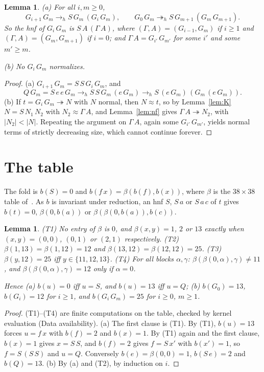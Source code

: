 \documentclass[11pt]{amsart}
\newtheorem{lemma}[theorem]{Lemma}
\theoremstyle{definition}
\newcommand{\red}{\twoheadrightarrow}
\newcommand{\hred}{\twoheadrightarrow_h}
\newcommand{\hstep}{\to_h}
\newcommand{\sz}[1]{\lvert#1\rvert}
\begin{document}
\begin{lemma}\label{lem:family}
\textup{(a)} For all $i,m\ge0$,
\[
G_{i+1}\,G_m\hstep S\,G_m\,(G_i\,G_m),\qquad G_0\,G_m\hred S\,G_{m+1}\,(G_m\,G_{m+1}).
\]
So the hnf of $G_i\,G_m$ is $S\,A\,(\Gamma\,A)$, where $(\Gamma,A)=(G_{i-1},G_m)$ if $i\ge1$ and
$(\Gamma,A)=(G_m,G_{m+1})$ if $i=0$; and $\Gamma\,A=G_{i'}\,G_{m'}$ for some $i'$ and some
$m'\ge m$.

\textup{(b)} No $G_i\,G_m$ normalizes.
\end{lemma}

\begin{proof}
(a) $G_{i+1}\,G_m=S\,S\,G_i\,G_m$, and
\[
Q\,G_m=S\,e\,e\,G_m\hstep S\,S\,G_m\,(e\,G_m)\hstep S\,(e\,G_m)\,(G_m\,(e\,G_m)).
\]
(b) If $t=G_i\,G_m\red N$ with $N$ normal, then $N\approx t$, so by Lemma~\ref{lem:K}
$N=S\,N_1\,N_2$ with $N_2\approx\Gamma\,A$, and Lemma~\ref{lem:nf} gives $\Gamma\,A\red N_2$, with
$\sz{N_2}<\sz N$. Repeating the argument on $\Gamma\,A$, again some $G_{i'}\,G_{m'}$, yields normal
terms of strictly decreasing size, which cannot continue forever.
\end{proof}

\section{The table}

The fold is $b(S)=0$ and $b(f\,x)=\beta(b(f),b(x))$, where $\beta$ is the $38\times38$ table
of~\citep{s1}. As $b$ is invariant under reduction, an hnf $S$, $S\,a$ or $S\,a\,c$ of $t$ gives
$b(t)=0$, $\beta(0,b(a))$ or $\beta(\beta(0,b(a)),b(c))$.

\begin{lemma}\label{lem:table}
\textup{(T1)} No entry of $\beta$ is $0$, and $\beta(x,y)=1$, $2$ or $13$ exactly when
$(x,y)=(0,0)$, $(0,1)$ or $(2,1)$ respectively.
\textup{(T2)} $\beta(1,13)=\beta(1,12)=12$ and $\beta(13,12)=\beta(12,12)=25$.
\textup{(T3)} $\beta(y,12)=25$ iff $y\in\{11,12,13\}$.
\textup{(T4)} For all blocks $\alpha,\gamma$:
$\beta(\beta(0,\alpha),\gamma)\ne11$, and $\beta(\beta(0,\alpha),\gamma)=12$ only if $\alpha=0$.

\noindent Hence \textup{(a)} $b(u)=0$ iff $u=S$, and $b(u)=13$ iff $u=Q$; \textup{(b)}
$b(G_0)=13$, $b(G_i)=12$ for $i\ge1$, and $b(G_i\,G_m)=25$ for $i\ge0$, $m\ge1$.
\end{lemma}

\begin{proof}
(T1)--(T4) are finite computations on the table, checked by kernel evaluation (Data
availability). (a) The first clause is (T1). By (T1), $b(u)=13$ forces $u=f\,x$ with $b(f)=2$ and
$b(x)=1$. By (T1) again and the first clause, $b(x)=1$ gives $x=S\,S$, and $b(f)=2$ gives
$f=S\,x'$ with $b(x')=1$, so $f=S\,(S\,S)$ and $u=Q$. Conversely $b(e)=\beta(0,0)=1$,
$b(S\,e)=2$ and $b(Q)=13$. (b) By (a) and (T2), by induction on $i$.
\end{proof}
\end{document}
